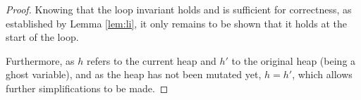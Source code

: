 \begin{proof}
  Knowing that the loop invariant holds and is sufficient for
  correctness, as established by Lemma \ref{lem:li}, it only remains
  to be shown that it holds at the start of the loop.

  \begin{prooftree}
  \end{prooftree}

Furthermore, as $h$ refers to the current heap and $h'$ to the
original heap (being a ghost variable), and as the heap has not been
mutated yet, $h = h'$, which allows further simplifications to be made.


\end{proof}

